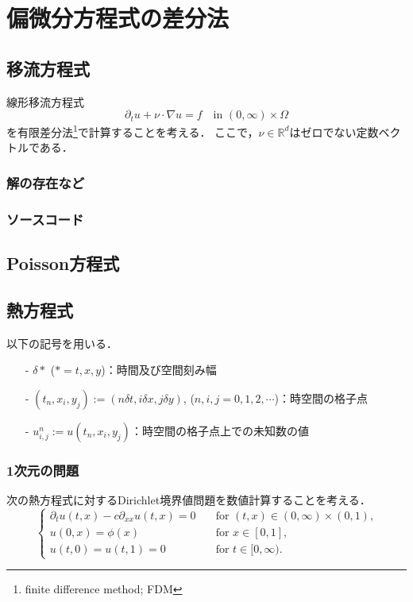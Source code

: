 \chapter{偏微分方程式の差分法}
\begin{abstract}

\end{abstract}

\section{移流方程式}
線形移流方程式
\begin{equation}
\partial_t u+\nu\cdot\nabla u=f\quad\text{in $(0,\infty)\times\Omega$}
\end{equation}
を有限差分法\footnote{finite difference method; FDM}で計算することを考える．
ここで，$\nu\in\mathbb{R}^d$はゼロでない定数ベクトルである．

\subsection{解の存在など}

\subsection{ソースコード}


\section{Poisson方程式}





\section{熱方程式}
以下の記号を用いる．
\begin{itemize}
\item[-] $\delta \ast$ ($\ast=t,x,y$)：時間及び空間刻み幅
\item[-] $(t_n ,x_i ,y_j):=(n \delta t,i \delta x,j \delta y)$, ($n,i,j=0,1,2,\cdots$)：時空間の格子点
\item[-] $u^{n}_{i,j}:=u(t_n, x_i, y_j)$：時空間の格子点上での未知数の値
\end{itemize}

\subsection{ 1次元の問題}
次の熱方程式に対するDirichlet境界値問題を数値計算することを考える．
\begin{equation}
\label{e:heat1d}
	\begin{cases}
		\partial_{t}u(t,x)-c\partial_{xx}u(t,x)=0\quad&\text{for $(t,x)\in(0,\infty)\times(0,1)$,}\\
		u(0,x)=\phi(x)\quad&\text{for $x\in[0,1]$,}\\
		u(t,0)=u(t,1)=0\quad&\text{for $t\in[0,\infty)$.}
	\end{cases}
\end{equation}

